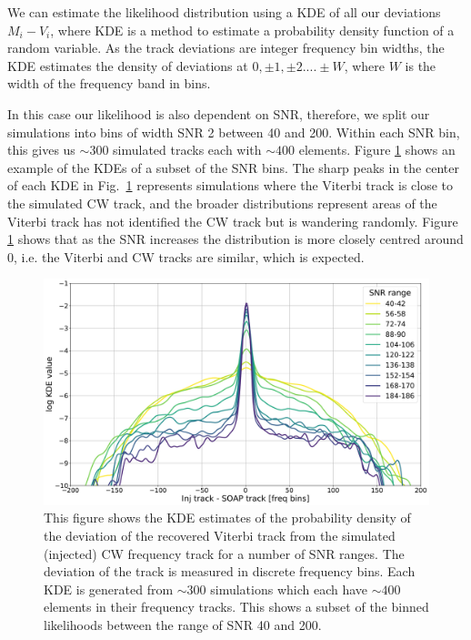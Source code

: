 We can estimate the likelihood distribution using a \gls{KDE}
of all our deviations $M_i - V_i$, where \gls{KDE} is a method to estimate a probability density function of a random variable.
As the track deviations are integer frequency bin widths, the \gls{KDE} estimates the density of deviations at $0, \pm 1, \pm 2 .... \pm W$, where $W$ is the width of the frequency band in bins.

In this case our likelihood is also dependent on \gls{SNR},
therefore, we split our simulations into bins of width \gls{SNR}
2 between 40 and 200. Within each \gls{SNR} bin, this gives us $\sim 300$
simulated tracks each with $\sim 400$ elements.  Figure
\ref{par_est:bayes:likelihood:kde142} shows an example of the \glspl{KDE} of a
subset of the \gls{SNR} bins. The sharp peaks in the center of
each \gls{KDE} in Fig.~\ref{par_est:bayes:likelihood:kde142} represents
simulations where the Viterbi track is close to the simulated \gls{CW} track,
and the broader distributions represent areas of the Viterbi track has not
identified the \gls{CW} track but is wandering randomly.  Figure \ref{par_est:bayes:likelihood:kde142} shows that as the \gls{SNR} increases
the distribution is more closely centred around 0, i.e. the Viterbi and
\gls{CW} tracks are similar, which is expected.

%
\begin{figure}[ht]
    \centering
    \includegraphics[width=\linewidth]{C5_parameter/KDE_range_40_200.pdf}
    \caption[KDE of likelihood in different \gls{SNR} ranges]{This figure shows
the \gls{KDE} estimates of the probability density of the deviation of the recovered Viterbi track from
the simulated (injected) \gls{CW} frequency track for a number of \gls{SNR} ranges. The deviation of the track is
measured in discrete frequency bins. Each \gls{KDE} is generated from $\sim
300$ simulations which each have $\sim 400$ elements in their frequency tracks.
This shows a subset of the binned likelihoods between the range of \gls{SNR} 40
and 200.} \label{par_est:bayes:likelihood:kde142}
    \end{figure}
%

